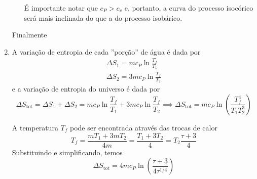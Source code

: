 \documentclass[12pt,a4paper,brazilian]{article}
\begin{document}
\begin{enumerate}
\begin{enumerate}
                É importante notar que \(c_P > c_v\) e, portanto, a curva do processo isocórico
                será mais inclinada do que a do processo isobárico.
        \end{enumerate}
        Finalmente
        \begin{center}
        \end{center}

    \item A variação de entropia de cada ''porção'' de água é dada por
        \begin{gather}
            \Delta S_1 = m c_P \ln\frac{T_f}{T_1} \\
            \Delta S_2 = 3m c_P \ln\frac{T_f}{T_2} 
        \end{gather}
        e a variação de entropia do universo é dada por 
        \[
            \Delta S_\text{tot} = \Delta S_1 + \Delta S_2 = 
            m c_P \ln\frac{T_f}{T_1} + 3m c_P \ln\frac{T_f}{T_2} \implies
            \Delta S_\text{tot} = mc_P\ln\left(\frac{T_f^4}{T_1 T_2^3}\right)
        \]

        A temperatura \(T_f\) pode ser encontrada através das trocas de calor
        \[
            T_f = \frac{mT_1 + 3mT_2}{4m} = \frac{T_1+3T_2}{4}=T_2 \frac{\tau + 3}{4}
        \]
        Substituindo e simplificando, temos
        \[
            \Delta S_\text{tot} = 4 mc_P \ln\left(\frac{\tau+3}{4\tau^{1/4}}\right)
        \]

\end{enumerate}
\end{document}
